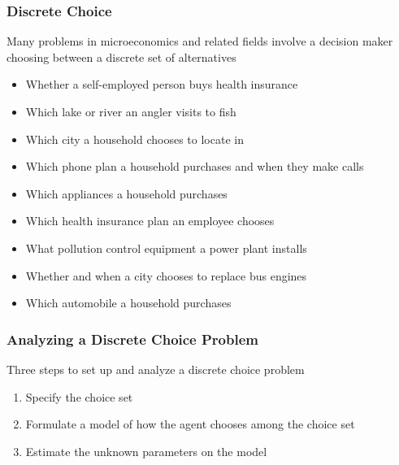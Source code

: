 \documentclass{beamer}
\begin{document}
\begin{frame}\frametitle{Discrete Choice}
    Many problems in microeconomics and related fields involve a decision maker choosing between a discrete set of alternatives
    \begin{itemize}
    	\item Whether a self-employed person buys health insurance
    	\item Which lake or river an angler visits to fish
    	\item Which city a household chooses to locate in
    	\item Which phone plan a household purchases and when they make calls
    	\item Which appliances a household purchases
    	\item Which health insurance plan an employee chooses
    	\item What pollution control equipment a power plant installs
    	\item Whether and when a city chooses to replace bus engines
    	\item Which automobile a household purchases
    \end{itemize}
\end{frame}

\begin{frame}\frametitle{Analyzing a Discrete Choice Problem}
    Three steps to set up and analyze a discrete choice problem
    \begin{enumerate}
    	\item Specify the choice set
    	\item Formulate a model of how the agent chooses among the choice set
    	\item Estimate the unknown parameters on the model
    \end{enumerate}
\end{frame}
\end{document}
